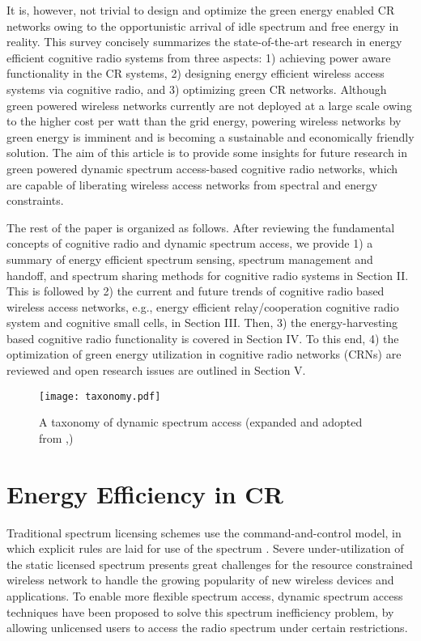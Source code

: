\documentclass[journal,12pt,onecolumn]{IEEEtran}
\begin{document}
It is, however, not trivial to design and optimize the green energy enabled CR networks owing to the opportunistic arrival of idle spectrum and free energy in reality. This survey concisely summarizes the state-of-the-art research in energy efficient cognitive radio systems from three aspects: 1) achieving power aware functionality in the CR systems, 2) designing energy efficient wireless access systems via cognitive radio, and 3) optimizing green CR networks. Although green powered wireless networks currently are not deployed at a large scale owing to the higher cost per watt than the grid energy, powering wireless networks by green energy is imminent and is becoming a sustainable and economically friendly solution. The aim of this article is to provide some insights for future research in green powered dynamic spectrum access-based cognitive radio networks, which are capable of liberating wireless access networks from spectral and energy constraints. 

The rest of the paper is organized as follows. After reviewing the fundamental concepts of cognitive radio and dynamic spectrum access, we provide 1) a summary of energy efficient spectrum sensing, spectrum management and handoff, and spectrum sharing methods for cognitive radio systems in Section II. This is followed by 2) the current and future trends of cognitive radio based wireless access networks, e.g., energy efficient relay/cooperation cognitive radio system and cognitive small cells, in Section III. Then, 3) the energy-harvesting based cognitive radio functionality is covered in Section IV. To this end, 4) the optimization of green energy utilization in cognitive radio networks (CRNs) are reviewed and open research issues are outlined in Section V. \begin{figure*}
\texttt{[image: taxonomy.pdf]}
\caption{A taxonomy of dynamic spectrum access (expanded and adopted from \cite{threestrategies},\cite{4221550})}
\label{taxonomy}
\end{figure*}

\section{Energy Efficiency in CR}
Traditional spectrum licensing schemes use the command-and-control model, in which explicit rules are laid for use of the
spectrum \cite{4221550}. Severe under-utilization of the static licensed spectrum presents great challenges for the resource constrained wireless network to handle the growing popularity of new wireless devices and applications. To enable more flexible spectrum access, dynamic spectrum access techniques have been proposed to solve this spectrum inefficiency problem, by allowing unlicensed users to access the radio spectrum under certain restrictions.
\end{document}
